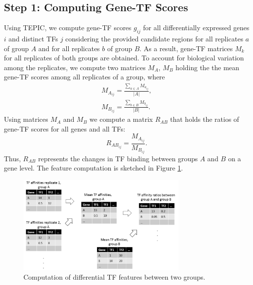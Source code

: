 \documentclass{article}
\begin{document}
\subsection*{Step 1: Computing Gene-TF Scores}
Using TEPIC, we compute gene-TF scores $g_{ij}$ for all differentially expressed genes $i$ and distinct TFs $j$ considering the provided candidate regions for all replicates $a$ of group $A$ and for all replicates $b$ of group $B$. 
As a result, gene-TF matrices $M_k$ for all replicates of both groups are obtained. To account for biological variation among the replicates, we compute two matrices $M_A$, $M_B$ holding the the mean gene-TF scores among all replicates of a group, where
\begin{align}
 M_{A_{ij}}= \frac{\sum_{a \in A}{M_{a_{ij}}}}{|A|},
 \\M_{B_{ij}}= \frac{\sum_{b \in B}{M_{b_{ij}}}}{|B|}.
\end{align}
Using matrices $M_A$ and $M_B$ we compute a matrix $R_{AB}$ that holds the ratios of gene-TF scores for all genes and all TFs:
\begin{equation}
    R_{AB_{ij}}=\frac{M_{A_{ij}}}{M_{B_{ij}}}.
\end{equation}
Thus, $R_{AB}$ represents the changes in TF binding between groups $A$ and $B$ on a gene level.
The feature computation is sketched in Figure \ref{TF-Gene-Score_Computation}.
\begin{figure}[h!]
\centering
\includegraphics[width=0.75\textwidth]{TF_Affinities.png}
\caption{Computation of differential TF features between two groups.}
\label{TF-Gene-Score_Computation}
\end{figure}
\end{document}
